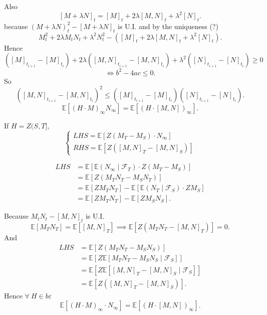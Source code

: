 {    Also 
    $$
        [M + \lambda N]_t = [M]_t + 2\lambda[M,N]_t + \lambda^2 [N]_t.
    $$
    because
    $
    (M+ \lambda N)_{t}^2 - [M+ \lambda N]_t
    $ is U.I. and by the uniqueness (?)
    $$
    M_t^2  + 2 \lambda M_t N_t + \lambda^2 N_t^2 -([M]_t + 2 \lambda [M,N]_t + \lambda^2 [N]_t).
    $$
    Hence 
    $$
    \left( [M]_{t_{i+1}} - [M]_{t_i} \right) + 2 \lambda \left( [M,N]_{t_{i+1}} - [M,N]_{t_i} \right) + \lambda^2 \left( [N]_{t_{i+1}} -[N]_{t_i} \right) \geq 0
    $$
    $$ 
    \Leftrightarrow b^2 - 4ac \leq 0.
    $$
    So
    $$
        \left( [M,N]_{t_{i+1}} - [M,N]_{t_i} \right)^2 \leq \left( [M]_{t_{i+1}} - [M]_{t_i} \right)\left( [N]_{t_{i+1}} - [N]_{t_i} \right).
    $$
    $$
        \mathbb{E}\left[ 
            (H\cdot M)_{\infty} N_{\infty}
         \right] = \mathbb{E}\left[ 
            (H \cdot [M,N])_{\infty}
          \right].
    $$

    If $H = Z(S,T]$, 
    $$\begin{cases}
     LHS = \mathbb{E}\left[ Z(M_T - M_S) \cdot N_\infty \right]\\
     RHS = \mathbb{E}\left[ Z([M,N]_{T} - [M,N]_S) \right]   
    \end{cases}$$

    $$
    \begin{aligned}
        LHS &= \mathbb{E}\left[ \mathbb{E}(N_\infty \mid \mathcal{F}_T) \cdot Z(M_T - M_S) \right] \\
        &= \mathbb{E}\left[ Z(M_T N_T - M_S N_T) \right]\\
        &= \mathbb{E}[ZM_TN_T] - \mathbb{E}\left[ \mathbb{E}(N_T \mid \mathcal{F}_S)\cdot ZM_S \right]\\
        &=\mathbb{E}\left[ Z M_T N_T \right] - \mathbb{E}[ZM_S N_S].
    \end{aligned}
    $$
    
    Because $M_t N_t - [M,N]_t$ is U.I.
    $$
    \mathbb{E}[M_T N_T] = \mathbb{E}[[M,N]_T] \implies \mathbb{E}[Z(M_T N_T - [M,N]_T)] = 0.
    $$
    And
    $$
    \begin{aligned}
        LHS &= \mathbb{E}\left[ Z(M_T N_T - M_S N_S) \right] \\
        &= \mathbb{E}\left[ Z \mathbb{E}\left[ M_TN_T -M_S N_S \mid \mathcal{F}_S \right] \right]\\
        &= \mathbb{E}\left[ Z \mathbb{E}[[M,N]_T - [M,N]_S \mid \mathcal{F}_S] \right]\\
        &=\mathbb{E}[Z([M,N]_T - [M,N]_S)].
    \end{aligned}
    $$
    Hence $\forall~ H \in b \varepsilon$
    $$
    \mathbb{E}[(H\cdot M)_{\infty} \cdot N_{\infty}] = \mathbb{E}\left[ (H \cdot [M,N])_{\infty} \right].
    $$
    
}
